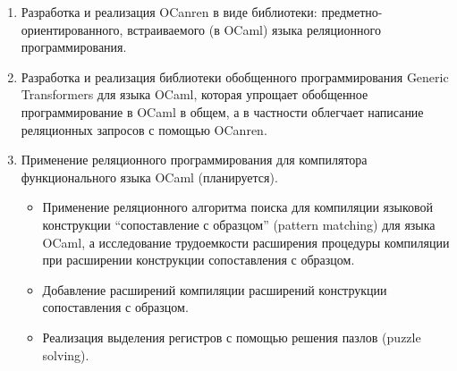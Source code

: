 {{}
\begin{enumerate}
  \item Разработка и реализация OCanren в виде библиотеки: предметно-ориентированного, встраиваемого (в OCaml) языка реляционного программирования.
  \item Разработка и реализация библиотеки обобщенного программирования Generic Transformers для языка OCaml, которая упрощает обобщенное программирование в OCaml в общем, а в частности облегчает написание реляционных запросов с помощью OCanren.
  \item Применение реляционного программирования для компилятора функционального языка OCaml (планируется). 
  \begin{itemize}
  \item Применение реляционного алгоритма поиска для компиляции языковой конструкции “сопоставление с образцом” (pattern matching) для языка OCaml, а исследование трудоемкости расширения процедуры компиляции при расширении конструкции сопоставления с образцом.
  \item Добавление расширений компиляции расширений конструкции сопоставления с образцом.
  \item Реализация выделения регистров с помощью решения пазлов (puzzle solving).
  \end{itemize}



  
  
\end{enumerate}
}

